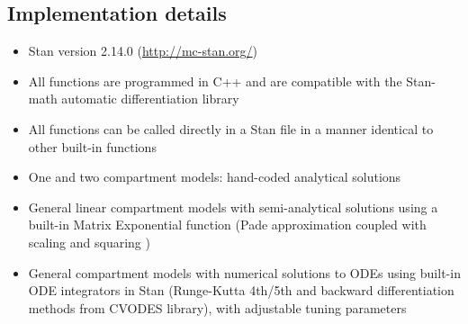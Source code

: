 \documentclass[11pt]{amsart}
\begin{document}
\subsection{Implementation details}
\begin{itemize}
  \item Stan version 2.14.0 (\url{http://mc-stan.org/})
  \item All functions are programmed in C++ and are compatible with the Stan-math automatic differentiation library \cite{AD}
  \item All functions can be called directly in a Stan file in a manner identical to other built-in functions
  \item One and two compartment models: hand-coded analytical solutions
  \item General linear compartment models with semi-analytical solutions using a built-in Matrix Exponential function (Pade approximation coupled with scaling and squaring \cite{matrixExp})
  \item General compartment models with numerical solutions to ODEs using built-in ODE integrators in Stan (Runge-Kutta 4th/5th and backward differentiation methods from CVODES library), with adjustable tuning parameters
\end{itemize}
\end{document}
